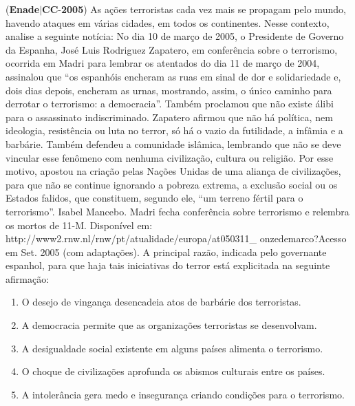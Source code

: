 \documentclass{exam}
\begin{document}
\begin{questions}
\question (\textbf{Enade}$|$\textbf{CC}-\textbf{2005}) As ações terroristas cada vez mais se propagam pelo mundo,
havendo ataques em várias cidades, em todos os continentes.
Nesse contexto, analise a seguinte notícia:
No dia 10 de março de 2005, o Presidente de Governo da
Espanha, José Luis Rodriguez Zapatero, em conferência sobre o
terrorismo, ocorrida em Madri para lembrar os atentados do dia
11 de março de 2004, assinalou que “os espanhóis encheram as
ruas em sinal de dor e solidariedade e, dois dias depois, encheram
as urnas, mostrando, assim, o único caminho para derrotar o
terrorismo: a democracia”. Também proclamou que não existe
álibi para o assassinato indiscriminado. Zapatero afirmou que não
há política, nem ideologia, resistência ou luta no terror, só há o
vazio da futilidade, a infâmia e a barbárie. Também defendeu a
comunidade islâmica, lembrando que não se deve vincular esse
fenômeno com nenhuma civilização, cultura ou religião. Por esse
motivo, apostou na criação pelas Nações Unidas de uma aliança de
civilizações, para que não se continue ignorando a pobreza
extrema, a exclusão social ou os Estados falidos, que constituem,
segundo ele, “um terreno fértil para o terrorismo”.
Isabel Mancebo. Madri fecha conferência sobre terrorismo e
relembra os mortos de 11-M. Disponível em:
http://www2.rnw.nl/rnw/pt/atualidade/europa/at050311\_
onzedemarco?Acesso em Set. 2005 (com adaptações).
A principal razão, indicada pelo governante espanhol, para que
haja tais iniciativas do terror está explicitada na seguinte
afirmação:
	\begin{enumerate}[label=\alph*)]
		\item  O desejo de vingança desencadeia atos de barbárie dos
terroristas.
		\item  A democracia permite que as organizações terroristas se
desenvolvam.
		\item  A desigualdade social existente em alguns países alimenta o
terrorismo.
		\item  O choque de civilizações aprofunda os abismos culturais
entre os países.
		\item  A intolerância gera medo e insegurança criando condições
para o terrorismo.

	\end{enumerate}


\end{questions}
\end{document}
